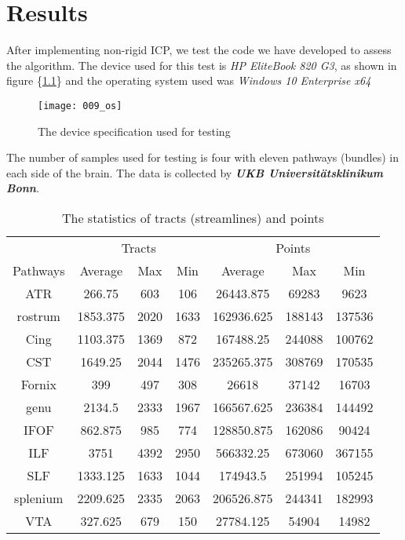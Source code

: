 \documentclass[../structure.tex]{subfiles}
\begin{document}
\chapter{Results}
\hspace{2em}After implementing non-rigid ICP, we test the code we have developed to assess the algorithm. The device used for this test is \textit{HP EliteBook 820 G3}, as shown in figure \{\ref{fig:OS}\} and the operating system used was \textit{Windows 10 Enterprise x64}
\\
\begin{figure}[h!]
\centering
\texttt{[image: 009\_os]}
\captionsetup{justification=centering}
\caption{The device specification used for testing}
\label{fig:OS}
\end{figure}

The number of samples used for testing is four with eleven pathways (bundles) in each side of the brain. The data is collected by \textbf{\textit{UKB Universitätsklinikum Bonn}}.
\begin{center}
\begin{table}[h!]
	\begin{tabular}{| c | c  c  c | c  c  c |}
	\toprule
	&\multicolumn{3}{c}{Tracts}&\multicolumn{3}{c}{Points}\\
Pathways&Average&Max&Min&Average&Max&Min\\
\midrule
ATR&266.75&603&106&26443.875&69283&9623\\
rostrum&1853.375&2020&1633&162936.625&188143&137536\\
Cing&1103.375&1369&872&167488.25&244088&100762\\
CST&1649.25&2044&1476&235265.375&308769&170535\\
Fornix&399&497&308&26618&37142&16703\\
genu&2134.5&2333&1967&166567.625&236384&144492\\
IFOF&862.875&985&774&128850.875&162086&90424\\
ILF&3751&4392&2950&566332.25&673060&367155\\
SLF&1333.125&1633&1044&174943.5&251994&105245\\
splenium&2209.625&2335&2063&206526.875&244341&182993\\
VTA&327.625&679&150&27784.125&54904&14982\\
\bottomrule
	\end{tabular}
\caption{The statistics of tracts (streamlines) and points}
\label{table:data}
\end{table}
\end{center}
\end{document}
